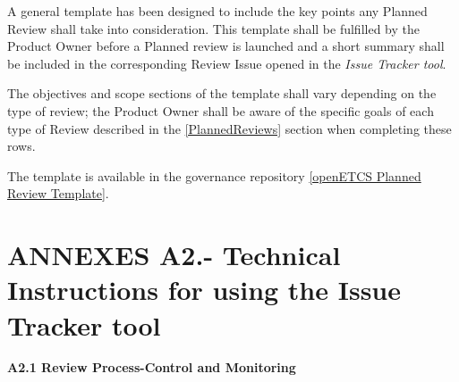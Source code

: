 \documentclass{template/openetcs_article}
\begin{document}
A general template has been designed to include the key points any Planned Review shall take into consideration. 
This template shall be fulfilled by the Product Owner before a Planned review is launched and a short summary shall be included in the corresponding Review Issue opened in the {\it Issue Tracker tool}.

The objectives and scope sections of the template shall vary depending on the type of review; the Product Owner shall be aware of the specific goals of each type of Review described in the \ref{PlannedReviews} section when completing these rows.
 
The template is available in the governance repository \href{https://github.com/openETCS/governance/tree/master/Templates}{[openETCS Planned Review Template]}.

\section{ANNEXES A2.- Technical Instructions for using the Issue Tracker tool}

\textbf{A2.1 Review Process-Control and Monitoring}
\end{document}
